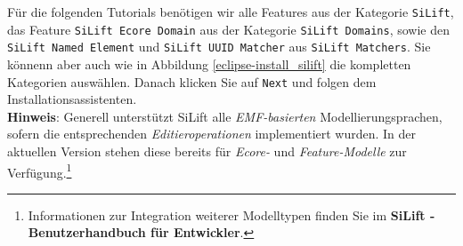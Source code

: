 Für die folgenden Tutorials benötigen wir alle Features aus der Kategorie \texttt{SiLift},  das Feature \texttt{SiLift Ecore Domain} aus der Kategorie \texttt{SiLift Domains}, sowie den \texttt{SiLift Named Element} und \texttt{SiLift UUID Matcher} aus \texttt{SiLift Matchers}. Sie könnenn aber auch wie in Abbildung \ref{eclipse-install_silift} die kompletten Kategorien auswählen. Danach klicken Sie auf \texttt{Next} und folgen dem Installationsassistenten.\\

\textbf{Hinweis}: Generell unterstützt SiLift alle \textit{EMF-basierten} Modellierungsprachen, sofern die ent\-sprech\-enden \textit{Editieroperationen} implementiert wurden.
In der aktuellen Version stehen diese bereits für \textit{Ecore-} und \textit{Feature-Modelle} zur Verfügung.\footnote{Informationen zur Integration weiterer Modelltypen finden Sie im \textbf{SiLift - Benutzerhandbuch für Entwickler}.}
